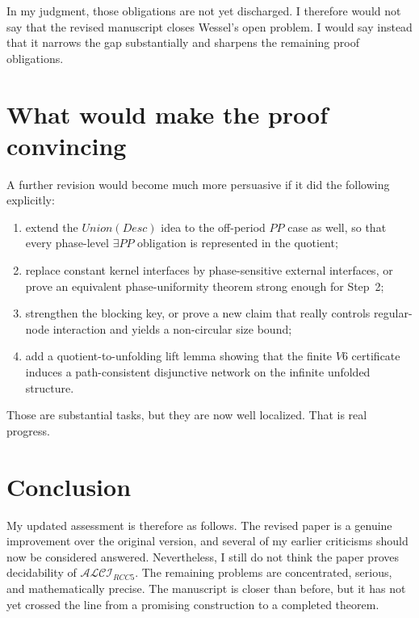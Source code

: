 \documentclass[11pt]{article}
\begin{document}
In my judgment, those obligations are not yet discharged. I therefore would not say that the revised manuscript closes Wessel's open problem. I would say instead that it narrows the gap substantially and sharpens the remaining proof obligations.

\section{What would make the proof convincing}

A further revision would become much more persuasive if it did the following explicitly:
\begin{enumerate}
  \item extend the $Union(Desc)$ idea to the off-period $PP$ case as well, so that every phase-level $\exists PP$ obligation is represented in the quotient;
  \item replace constant kernel interfaces by phase-sensitive external interfaces, or prove an equivalent phase-uniformity theorem strong enough for Step~2;
  \item strengthen the blocking key, or prove a new claim that really controls regular-node interaction and yields a non-circular size bound;
  \item add a quotient-to-unfolding lift lemma showing that the finite $V6$ certificate induces a path-consistent disjunctive network on the infinite unfolded structure.
\end{enumerate}

Those are substantial tasks, but they are now well localized. That is real progress.

\section{Conclusion}

My updated assessment is therefore as follows. The revised paper is a genuine improvement over the original version, and several of my earlier criticisms should now be considered answered. Nevertheless, I still do not think the paper proves decidability of $\mathcal{ALCI}_{RCC5}$. The remaining problems are concentrated, serious, and mathematically precise. The manuscript is closer than before, but it has not yet crossed the line from a promising construction to a completed theorem.
\end{document}
